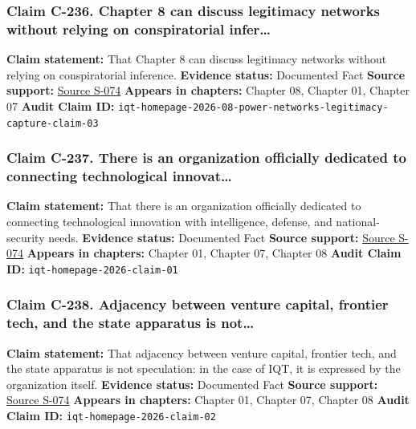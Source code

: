 \documentclass[
  american,
  11pt,
  letterpaper,
]{article}
\begin{document}
\subsubsection{Claim C-236. Chapter 8 can discuss legitimacy networks
without relying on conspiratorial
infer\ldots{}}\label{claim-c-236-chapter-8-can-discuss-legitimacy-networks-without-relying-on-conspiratorial-infer}

\textbf{Claim statement:} That Chapter 8 can discuss legitimacy networks
without relying on conspiratorial inference. \textbf{Evidence status:}
Documented Fact \textbf{Source support:}
\hyperref[source-s-074-in-q-tel]{Source S-074} \textbf{Appears in
chapters:} Chapter 08, Chapter 01, Chapter 07 \textbf{Audit Claim ID:}
\texttt{iqt-homepage-2026-08-power-networks-legitimacy-capture-claim-03}

\subsubsection{Claim C-237. There is an organization officially
dedicated to connecting technological
innovat\ldots{}}\label{claim-c-237-there-is-an-organization-officially-dedicated-to-connecting-technological-innovat}

\textbf{Claim statement:} That there is an organization officially
dedicated to connecting technological innovation with intelligence,
defense, and national-security needs. \textbf{Evidence status:}
Documented Fact \textbf{Source support:}
\hyperref[source-s-074-in-q-tel]{Source S-074} \textbf{Appears in
chapters:} Chapter 01, Chapter 07, Chapter 08 \textbf{Audit Claim ID:}
\texttt{iqt-homepage-2026-claim-01}

\subsubsection{Claim C-238. Adjacency between venture capital, frontier
tech, and the state apparatus is
not\ldots{}}\label{claim-c-238-adjacency-between-venture-capital-frontier-tech-and-the-state-apparatus-is-not}

\textbf{Claim statement:} That adjacency between venture capital,
frontier tech, and the state apparatus is not speculation: in the case
of IQT, it is expressed by the organization itself. \textbf{Evidence
status:} Documented Fact \textbf{Source support:}
\hyperref[source-s-074-in-q-tel]{Source S-074} \textbf{Appears in
chapters:} Chapter 01, Chapter 07, Chapter 08 \textbf{Audit Claim ID:}
\texttt{iqt-homepage-2026-claim-02}
\end{document}
